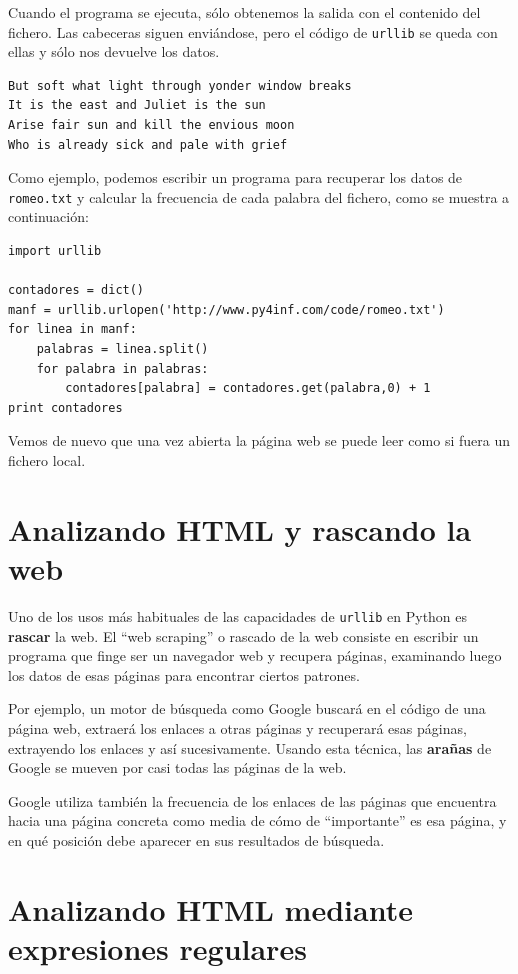 Cuando el programa se ejecuta, sólo obtenemos la
salida con el contenido del fichero. Las cabeceras
siguen enviándose, pero el código de {\tt urllib}
se queda con ellas y sólo nos devuelve
los datos.

\beforeverb
\begin{verbatim}
But soft what light through yonder window breaks
It is the east and Juliet is the sun
Arise fair sun and kill the envious moon
Who is already sick and pale with grief
\end{verbatim}
\afterverb
%

Como ejemplo, podemos escribir un
programa para recuperar los datos de
{\tt romeo.txt} y calcular la frecuencia
de cada palabra del fichero, como se muestra a continuación:

\beforeverb
\begin{verbatim}
import urllib

contadores = dict()
manf = urllib.urlopen('http://www.py4inf.com/code/romeo.txt')
for linea in manf:
    palabras = linea.split()
    for palabra in palabras:
        contadores[palabra] = contadores.get(palabra,0) + 1   
print contadores
\end{verbatim}
\afterverb
%
Vemos de nuevo que una vez abierta la página web
se puede leer como si fuera un fichero local.

\section{Analizando HTML y rascando la web}

Uno de los usos más habituales de las capacidades de {\tt urllib} en Python
es {\bf rascar} la web. El ``web scraping'' o rascado de la web consiste en escribir un programa
que finge ser un navegador web y recupera páginas, examinando
luego los datos de esas páginas para encontrar ciertos patrones.

Por ejemplo, un motor de búsqueda como Google buscará en el código
de una página web, extraerá los enlaces a otras páginas y recuperará
esas páginas, extrayendo los enlaces y así sucesivamente. Usando esta técnica,
las  {\bf arañas} de Google se mueven por casi todas las páginas de
la web.

Google utiliza también la frecuencia de los enlaces de las páginas que encuentra
hacia una página concreta como media de cómo de ``importante'' es
esa página, y en qué posición debe aparecer en sus resultados de búsqueda.

\section{Analizando HTML mediante expresiones regulares}

